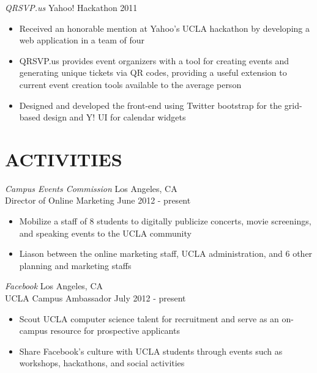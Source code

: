 \documentclass{res}
\begin{document}
\begin{resume}
 {\sl QRSVP.us} \hfill Yahoo! Hackathon 2011
  \begin{itemize} \itemsep -2pt
  \item Received an honorable mention at Yahoo's UCLA hackathon by developing a web application in a team of four
  \item QRSVP.us provides event organizers with a tool for creating events and generating unique tickets via QR codes, providing a useful extension to current event creation tools available to the average person
  \item Designed and developed the front-end using Twitter bootstrap for the grid-based design and Y! UI for calendar widgets
  \end{itemize} \vspace{-6pt}

\section{ACTIVITIES}
\vspace{6pt}
  {\sl Campus Events Commission} \hfill Los Angeles, CA \\
  Director of Online Marketing \hfill June 2012 - present
  \begin{itemize} \itemsep -2pt
    \item Mobilize a staff of 8 students to digitally publicize concerts, movie screenings, and  speaking events to the UCLA community
    \item Liason between the online marketing staff, UCLA administration, and 6 other planning and marketing staffs
  \end{itemize} \vspace{-8pt}

  {\sl Facebook} \hfill Los Angeles, CA \\
  UCLA Campus Ambassador \hfill July 2012 - present
  \begin{itemize} \itemsep -2pt
    \item Scout UCLA computer science talent for recruitment and serve as an on-campus resource for prospective applicants
    \item Share Facebook's culture with UCLA students through events such as workshops,  hackathons, and social activities
  \end{itemize} \vspace{-6pt}


\end{resume}
\end{document}

